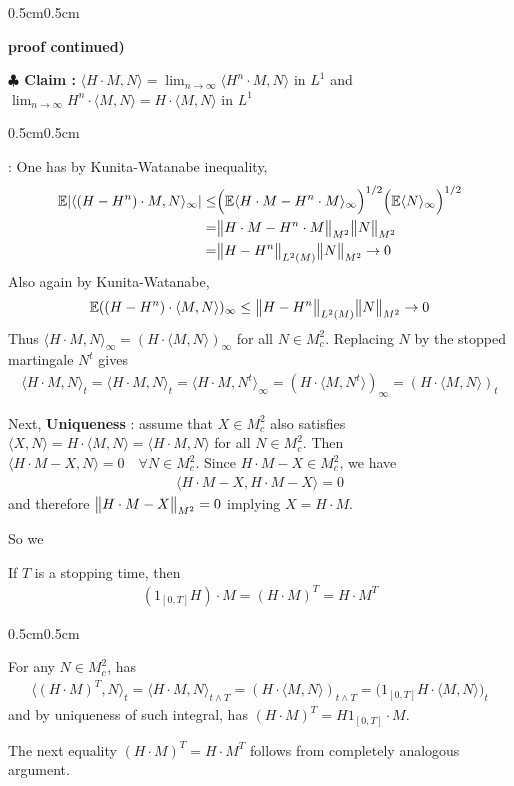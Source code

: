 \documentclass[12pt,a4paper]{article}
\newenvironment{proof}
{\begin{changemargin}{0.5cm}{0.5cm} 
	}%
	{\end{changemargin}
}
\newenvironment{subproof}
{\begin{changemargin}{0.5cm}{0.5cm} 
	}%
	{\end{changemargin}
}
\newenvironment{p}
{\begin{proof} 
	}%
	{\end{proof}
}
\begin{document}
\begin{p}
\textbf{proof continued)}

\textbf{$\clubsuit$ Claim : } $\langle H \cdot M, N \rangle = \lim_{n\rightarrow \infty} \langle H^n \cdot M, N \rangle$ in $L^1$ and $\lim_{n\rightarrow \infty} H^n \cdot \langle M, N \rangle = H \cdot \langle M, N \rangle$ in $L^1$
\begin{subproof}
: One has by Kunita-Watanabe inequality,
\begin{align*}
\mathbb{E} |\langle (H - H^n) \cdot M, N \rangle_{\infty}| \leq & \Big( \mathbb{E} \langle H \cdot M - H^n \cdot M \rangle_{\infty} \Big)^{1/2} \Big( \mathbb{E} \langle N \rangle_{\infty}\Big)^{1/2}\\
= & \bigl\lVert H \cdot M - H^n \cdot M\bigr\rVert_{M^2} \bigl\lVert N\bigr\rVert_{M^2} \\
= & \bigl\lVert H - H^n\bigr\rVert_{L^2(M)}\bigl\lVert N\bigr\rVert_{M^2}  \rightarrow 0
\end{align*}
Also again by Kunita-Watanabe,
\begin{align*}\mathbb{E} ((H- H^n)\cdot \langle M, N \rangle)_{\infty} \leq \bigl\lVert H-H^n\bigr\rVert_{L^2(M)} \bigl\lVert N\bigr\rVert_{M^2} \rightarrow 0
\end{align*}
Thus $\langle H \cdot M, N \rangle_{\infty} = (H \cdot \langle M, N \rangle)_{\infty}$ for all $N \in M_c^2$. Replacing $N$ by the stopped martingale $N^t$ gives
\begin{align*}
\langle H\cdot M, N \rangle_t = \langle H \cdot M, N \rangle_t = \langle H \cdot M, N^t \rangle_{\infty} = (H \cdot \langle M, N^t \rangle)_{\infty} = (H\cdot \langle M, N \rangle)_t
\end{align*}
\end{subproof} 
Next, \textbf{Uniqueness} : assume that $X\in M^2_c$ also satisfies $\langle X, N \rangle = H \cdot \langle M, N \rangle = \langle H\cdot M, N \rangle$ for all $N \in M_c^2$. Then $\langle H \cdot M - X, N \rangle =0 \quad \forall N \in M^2_c$. Since $H \cdot M -X \in M_c^2$, we have
\begin{align*}
\langle H \cdot M -X, H \cdot M - X \rangle =0
\end{align*}
and therefore $\bigl\lVert H\cdot M - X\bigr\rVert_{M^2}=0$ implying $X = H\cdot M$.

\eop
\end{p}
\s

So we 

\s
\corr If $T$ is a stopping time, then
\begin{align*}
(1_{[0, T]}H) \cdot M = (H \cdot M)^T = H\cdot M^T
\end{align*}
\begin{p}
\pf For any $N \in M_c^2$, has
\begin{align*}
\langle (H \cdot M)^T, N \rangle_t = \langle H \cdot M, N \rangle_{t\wedge T} = (H \cdot \langle M, N \rangle)_{t\wedge T} = \big( 1_{[0, T]} H \cdot \langle M, N \rangle \big)_t 
\end{align*}
and by uniqueness of such integral, has $(H \cdot M)^T = H 1_{[0, T]} \cdot M$.

\quad The next equality $(H \cdot M)^T = H \cdot M^T$ follows from completely analogous argument.

\eop
\end{p}
\s
\end{document}
